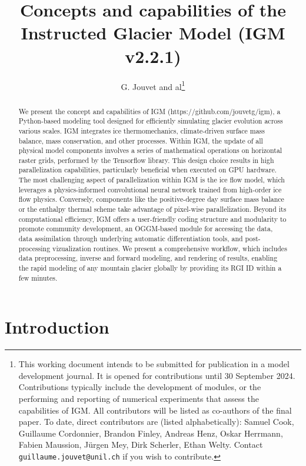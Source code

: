 \documentclass[10pt,twocolumn]{article}
\author{G. Jouvet and al\footnote{This working document intends to be submitted for publication in a model development journal. It is opened for contributions until 30 September 2024. Contributions typically include the development of modules, or the performing and reporting of numerical experiments that assess the capabilities of IGM. All contributors will be listed as co-authors of the final paper. To date, direct contributors are (listed alphabetically): Samuel Cook, Guillaume Cordonnier, Brandon Finley, Andreas Henz, Oskar Herrmann, Fabien Maussion, Jürgen Mey, Dirk Scherler, Ethan Welty. Contact \texttt{guillaume.jouvet@unil.ch} if you wish to contribute.}}
\begin{document}
\allowdisplaybreaks 

\title{Concepts and capabilities of the Instructed Glacier Model (IGM v2.2.1)}

\maketitle
 
\begin{abstract}
We present the concept and capabilities of IGM (https://github.com/jouvetg/igm), 
a Python-based modeling tool designed for efficiently simulating glacier evolution 
across various scales. IGM integrates ice thermomechanics, climate-driven surface 
mass balance, mass conservation, and other processes. Within IGM, the update of all physical 
model components involves a series of mathematical operations on horizontal raster grids, 
performed by the Tensorflow library. This design choice results in high parallelization 
capabilities, particularly beneficial when executed on GPU hardware. 
The most challenging aspect of parallelization within IGM is the ice flow model, 
which leverages a physics-informed convolutional neural network trained from 
high-order ice flow physics. Conversely, components like the 
positive-degree day surface mass balance or the enthalpy thermal scheme 
take advantage of pixel-wise parallelization. Beyond its computational efficiency, 
IGM offers a user-friendly coding structure and modularity to promote community 
development, an OGGM-based module for accessing the data, data assimilation through 
underlying automatic differentiation tools, and post-processing vizualization routines. 
We present a comprehensive workflow, which includes data preprocessing, 
inverse and forward modeling, and rendering of results, enabling the rapid modeling 
of any mountain glacier globally by providing its RGI ID within a few minutes. 
\end{abstract}

\section{Introduction} 
\end{document}
